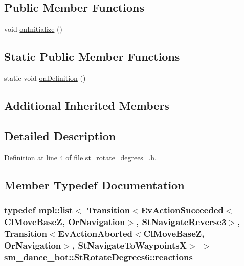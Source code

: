 \subsection*{Public Member Functions}
\begin{DoxyCompactItemize}
\item 
void \hyperlink{structsm__dance__bot_1_1StRotateDegrees6_ac6bbf8ae2f6d6696c7dee7a8846a8bff}{on\+Initialize} ()
\end{DoxyCompactItemize}
\subsection*{Static Public Member Functions}
\begin{DoxyCompactItemize}
\item 
static void \hyperlink{structsm__dance__bot_1_1StRotateDegrees6_a74c6db98216d664a2aeaa89a08a07600}{on\+Definition} ()
\end{DoxyCompactItemize}
\subsection*{Additional Inherited Members}


\subsection{Detailed Description}


Definition at line 4 of file st\+\_\+rotate\+\_\+degrees\+\_.\+h.



\subsection{Member Typedef Documentation}
\subsubsection[{\texorpdfstring{reactions}{reactions}}]{\setlength{\rightskip}{0pt plus 5cm}typedef mpl\+::list$<$ Transition$<$Ev\+Action\+Succeeded$<${\bf Cl\+Move\+BaseZ}, {\bf Or\+Navigation}$>$, {\bf St\+Navigate\+Reverse3}$>$, Transition$<$Ev\+Action\+Aborted$<${\bf Cl\+Move\+BaseZ}, {\bf Or\+Navigation}$>$, {\bf St\+Navigate\+To\+WaypointsX}$>$ $>$ {\bf sm\+\_\+dance\+\_\+bot\+::\+St\+Rotate\+Degrees6\+::reactions}}\hypertarget{structsm__dance__bot_1_1StRotateDegrees6_a6f12012f35d4f854115f900ea511d75d}{}\label{structsm__dance__bot_1_1StRotateDegrees6_a6f12012f35d4f854115f900ea511d75d}


